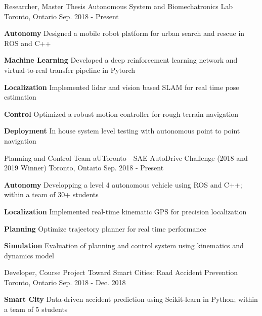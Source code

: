 \begin{cventries}
	\cventry
	{Researcher, Master Thesis}
	{Autonomous System and Biomechatronics Lab}
	{Toronto, Ontario}
	{Sep. 2018 - Present}
	{
		\begin{cvitems}
			\item {
				\textbf{Autonomy} Designed a mobile robot platform for urban search and rescue in ROS and C++
			}
			\item {
				\textbf{Machine Learning} Developed a deep reinforcement learning network and virtual-to-real transfer pipeline in Pytorch
			}
			\item {
				\textbf{Localization} Implemented lidar and vision based SLAM for real time pose estimation
			}
			\item {
				\textbf{Control} Optimized a robust motion controller for rough terrain navigation
			}
			\item {
				\textbf{Deployment} In house system level testing with autonomous point to point navigation
			}
		\end{cvitems}
	}
	\cventry
	{Planning and Control Team}
	{aUToronto - SAE AutoDrive Challenge (2018 and 2019 Winner)}
	{Toronto, Ontario}
	{Sep. 2018 - Present}
	{
		\begin{cvitems}
			\item {\textbf{Autonomy} Developping a level 4 autonomous vehicle using ROS and C++; within a team of 30+ students}
			\item {\textbf{Localization} Implemented real-time kinematic GPS for precision localization
			}
			\item {\textbf{Planning} Optimize trajectory planner for real time performance		
			}
			\item {\textbf{Simulation} Evaluation of planning and control system using kinematics and dynamics model
			}
		\end{cvitems}
	}	
	\cventry
	{Developer, Course Project}
	{Toward Smart Cities: Road Accident Prevention}
	{Toronto, Ontario}
	{Sep. 2018 - Dec. 2018}
	{
		\begin{cvitems}
			\item {\textbf{Smart City} Data-driven accident prediction using Scikit-learn in Python; within a team of 5 students}

\end{cvitems}}
\end{cventries}
